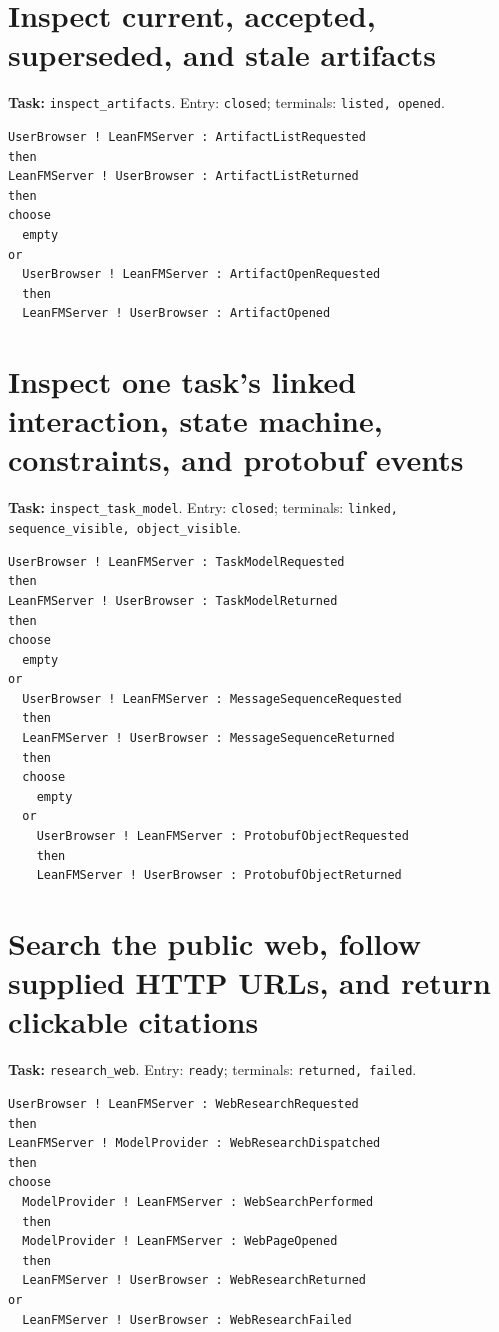 \section{Inspect current, accepted, superseded, and stale artifacts}
\noindent\textbf{Task:} \texttt{inspect\_artifacts}. Entry: \texttt{closed}; terminals: \texttt{listed, opened}.
\begin{verbatim}
UserBrowser ! LeanFMServer : ArtifactListRequested
then
LeanFMServer ! UserBrowser : ArtifactListReturned
then
choose
  empty
or
  UserBrowser ! LeanFMServer : ArtifactOpenRequested
  then
  LeanFMServer ! UserBrowser : ArtifactOpened
\end{verbatim}
\section{Inspect one task's linked interaction, state machine, constraints, and protobuf events}
\noindent\textbf{Task:} \texttt{inspect\_task\_model}. Entry: \texttt{closed}; terminals: \texttt{linked, sequence\_visible, object\_visible}.
\begin{verbatim}
UserBrowser ! LeanFMServer : TaskModelRequested
then
LeanFMServer ! UserBrowser : TaskModelReturned
then
choose
  empty
or
  UserBrowser ! LeanFMServer : MessageSequenceRequested
  then
  LeanFMServer ! UserBrowser : MessageSequenceReturned
  then
  choose
    empty
  or
    UserBrowser ! LeanFMServer : ProtobufObjectRequested
    then
    LeanFMServer ! UserBrowser : ProtobufObjectReturned
\end{verbatim}
\section{Search the public web, follow supplied HTTP URLs, and return clickable citations}
\noindent\textbf{Task:} \texttt{research\_web}. Entry: \texttt{ready}; terminals: \texttt{returned, failed}.
\begin{verbatim}
UserBrowser ! LeanFMServer : WebResearchRequested
then
LeanFMServer ! ModelProvider : WebResearchDispatched
then
choose
  ModelProvider ! LeanFMServer : WebSearchPerformed
  then
  ModelProvider ! LeanFMServer : WebPageOpened
  then
  LeanFMServer ! UserBrowser : WebResearchReturned
or
  LeanFMServer ! UserBrowser : WebResearchFailed
\end{verbatim}
